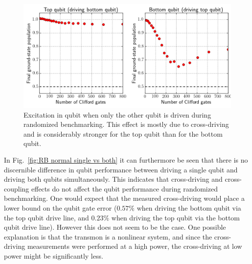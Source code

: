         \begin{figure}[tb]
          \centering
          \includegraphics[width=\textwidth]{Figures/Randomized benchmarking/RB_normal_cross-driving.png}
          \caption{Excitation in qubit when only the other qubit is driven during randomized benchmarking. This effect is mostly due to cross-driving and is considerably stronger for the top qubit than for the bottom qubit.}
          \label{fig:RB normal cross-driving}
        \end{figure}

        In Fig.~\ref{fig:RB normal single vs both} it can furthermore be seen that there is no discernible difference in qubit performance between driving a single qubit and driving both qubits simultaneously. This indicates that cross-driving and cross-coupling effects do not affect the qubit performance during randomized benchmarking. One would expect that the measured cross-driving would place a lower bound on the qubit gate error ($0.57\%$ when driving the bottom qubit via the top qubit drive line, and $0.23\%$ when driving the top qubit via the bottom qubit drive line). However this does not seem to be the case. One possible explanation is that the transmon is a nonlinear system, and since the cross-driving measurements were performed at a high power, the cross-driving at low power might be significantly less.

